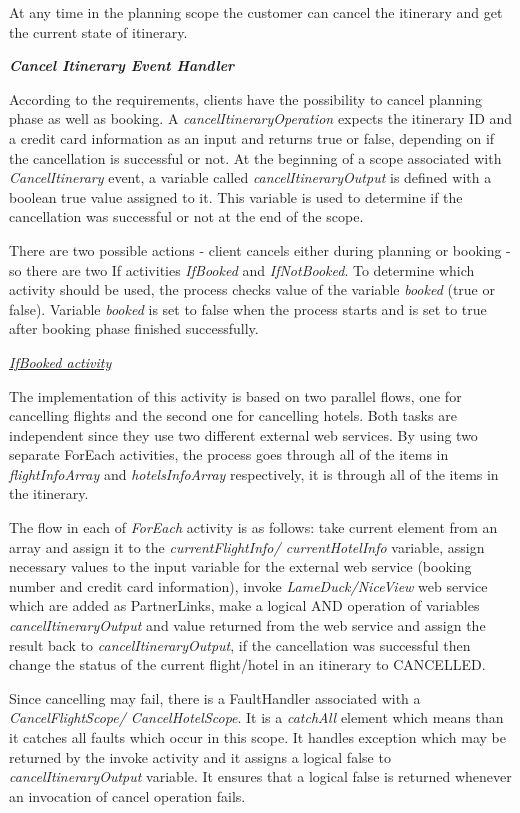 At any time in the planning scope the customer can cancel the itinerary and get the current state of itinerary.

\textbf{\textit{Cancel Itinerary Event Handler}}

According to the requirements, clients have the possibility to cancel planning phase as well as booking. A \textit{cancelItineraryOperation} expects the itinerary ID and a credit card information as an input and returns true or false, depending on if the cancellation is successful or not. At the beginning  of a scope associated with \textit{CancelItinerary} event, a variable called \textit{cancelItineraryOutput} is defined with a boolean true value assigned to it. This variable is used to determine if the cancellation was successful or not at the end of the scope.

There are two possible actions - client cancels either during planning or booking - so there are two If activities \textit{IfBooked} and \textit{IfNotBooked}. To determine which activity should be used, the process checks value of the variable \textit{booked} (true or false). Variable \textit{booked} is set to false when the process starts and is set to true after booking phase finished successfully. 

\underline{\textit{IfBooked activity}}

The implementation of this activity is based on two parallel flows, one for cancelling flights and the second one for cancelling hotels. Both tasks are independent since they use two different external web services. By using two separate ForEach activities, the process goes through all of the items in \textit{flightInfoArray} and \textit{hotelsInfoArray} respectively, it is through all of the items in the itinerary.

The flow in each of \textit{ForEach} activity is as follows:
take current element from an array and assign it to the \textit{currentFlightInfo/ currentHotelInfo} variable,
assign necessary values to the input variable for the external web service (booking number and credit card information),
invoke\textit{ LameDuck/NiceView} web service which are added as PartnerLinks,
make a logical AND operation of variables \textit{cancelItineraryOutput} and value returned from the web service and assign the result back to \textit{cancelItineraryOutput},
if the cancellation was successful then change the status of the current flight/hotel in an itinerary to CANCELLED.

Since cancelling may fail, there is a FaultHandler associated with a \textit{CancelFlightScope/ CancelHotelScope}. It is a \textit{catchAll} element which means than it catches all faults which occur in this scope. It handles exception which may be returned by the invoke activity and it assigns a logical false to \textit{cancelItineraryOutput} variable. It ensures that a logical false is returned whenever an invocation of cancel operation fails. 

